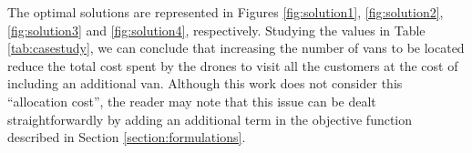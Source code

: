 \documentclass[a4paper,  review, authoryear, 1p.]{elsarticle}
\begin{document}
{		%
		\begin{table}[H]
			\centering
			\caption{Optimal solution and runtime for each configuration}
		\end{table}
		
		The optimal solutions are represented in Figures \ref{fig:solution1}, \ref{fig:solution2}, \ref{fig:solution3} and \ref{fig:solution4}, respectively. Studying the values in Table \ref{tab:casestudy}, we can conclude that increasing the number of vans to be located reduce the total cost spent by the drones to visit all the customers at the cost of including an additional van. Although this work does not consider this ``allocation cost'', the reader may note that this issue can be dealt straightforwardly by adding an additional term in the objective function described in Section \ref{section:formulations}.
		
}
\end{document}
